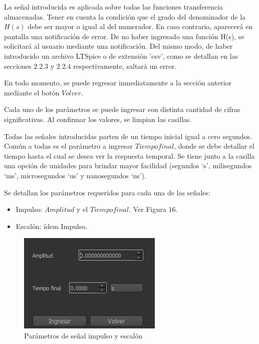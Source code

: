 La señal introducida es aplicada sobre todas las funciones transferencia almacenadas. Tener en cuenta la condición que el grado del denominador de la $H(s)$ debe ser mayor o igual al del numerador. En caso contrario, aparecerá en pantalla una notificación de error. De no haber ingresado una función H(s), se solicitará al usuario mediante una notificación. Del mismo modo, de haber introducido un archivo LTSpice o de extensión 'csv', como se detallan en las secciones $2.2.3$ y $2.2.4$ respectivamente, saltará un error.

En todo momento, se puede regresar inmediatamente a la sección anterior mediante el botón $Volver$.

Cada uno de los parámetros se puede ingresar con distinta cantidad de cifras significativas. Al confirmar los valores, se limpian las casillas. 

Todas las señales introducidas parten de un tiempo inicial igual a cero segundos. Común a todas es el parámetro a ingresar $Tiempo final$, donde se debe detallar el tiempo hasta el cual se desea ver la respuesta temporal. Se tiene junto a la casilla una opción de unidades para brindar mayor facilidad (segundos ‘s’, milisegundos ‘ms’, microsegundos ‘us’ y nanosegundos ‘ns’). 

Se detallan los parámetros requeridos para cada una de las señales:





\begin{itemize}
    \item Impulso: $Amplitud$ y el $Tiempo final$. Ver Figura 16. 
\end{itemize}

\begin{itemize}
    \item Escalón: ídem Impulso.
\end{itemize}


\begin{figure}[!htb] 
    \centering 
    \includegraphics  [scale=0.8] {../EJ2/LatexScreenshots/impulse.png} 
    \caption{Parámetros de señal impulso y escalón}
    \label{fig:impulse}
    \end{figure}

